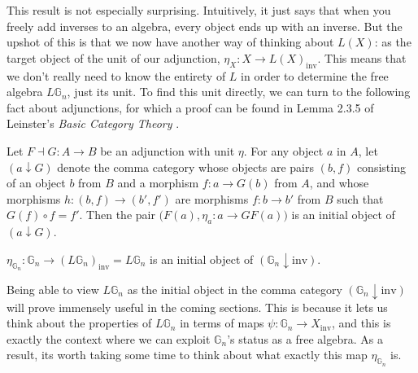 This result is not especially surprising. Intuitively, it just says that when you freely add inverses to an algebra, every object ends up with an inverse. But the upshot of this is that we now have another way of thinking about $L(X)$: as the target object of the unit of our adjunction, $\eta_X: X \to L(X)_{\mathrm{inv}}$. This means that we don't really need to know the entirety of $L$ in order to determine the free algebra $L\mathbb{G}_n$, just its unit. To find this unit directly, we can turn to the following fact about adjunctions, for which a proof can be found in Lemma 2.3.5 of Leinster's \textit{Basic Category Theory} \cite{bct}.

\begin{prop}\label{initial} Let $F \dashv G: A \to B$ be an adjunction with unit $\eta$. For any object $a$ in $A$, let $(a \downarrow G)$ denote the comma category whose objects are pairs $(b, f)$ consisting of an object $b$ from $B$ and a morphism $f: a \to G(b)$ from $A$, and whose morphisms $h: (b, f) \to (b', f')$ are morphisms $f: b \to b'$ from $B$ such that $G(f) \circ f = f'$. Then the pair $\big(F(a), \eta_a: a \to GF(a) \big)$ is an initial object of $(a \downarrow G)$.
\end{prop}

\begin{cor} $\eta_{\mathbb{G}_n}: \mathbb{G}_n \to (L\mathbb{G}_n)_{\mathrm{inv}} = L\mathbb{G}_n$ is an initial object of $(\mathbb{G}_n \downarrow \mathrm{inv})$.
\end{cor}

Being able to view $L\mathbb{G}_n$ as the initial object in the comma category $(\mathbb{G}_n \downarrow \mathrm{inv})$ will prove immensely useful in the coming sections. This is because it lets us think about the properties of $L\mathbb{G}_n$ in terms of maps $\psi: \mathbb{G}_n \to X_{\mathrm{inv}}$, and this is exactly the context where we can exploit $\mathbb{G}_n$'s status as a free algebra. As a result, its worth taking some time to think about what exactly this map $\eta_{\mathbb{G}_n}$ is.

